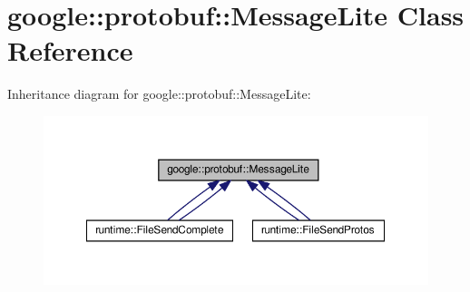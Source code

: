 \hypertarget{classgoogle_1_1protobuf_1_1MessageLite}{}\section{google\+:\+:protobuf\+:\+:Message\+Lite Class Reference}
\label{classgoogle_1_1protobuf_1_1MessageLite}


Inheritance diagram for google\+:\+:protobuf\+:\+:Message\+Lite\+:
\nopagebreak
\begin{figure}[H]
\begin{center}
\leavevmode
\includegraphics[width=350pt]{classgoogle_1_1protobuf_1_1MessageLite__inherit__graph}
\end{center}
\end{figure}
